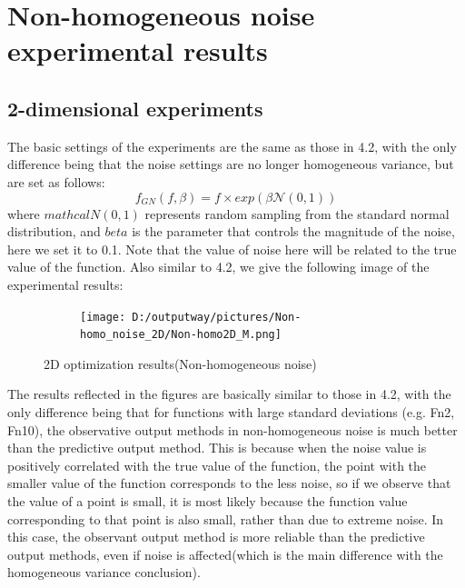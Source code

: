 \documentclass{article}
\begin{document}
\section{Non-homogeneous noise experimental results}
\subsection{2-dimensional experiments}
The basic settings of the experiments are the same as those in 4.2, with the only difference being that the noise settings are no longer homogeneous variance, but are set as follows:
\begin{equation}\label{eq12}
	f_{GN}(f,\beta) = f \times exp(\beta\mathcal{N}(0,1)) 
\end{equation}
where $mathcal{N}(0,1)$ represents random sampling from the standard normal distribution, and $beta$ is the parameter that controls the magnitude of the noise, here we set it to 0.1. Note that the value of noise here will be related to the true value of the function. Also similar to 4.2, we give the following image of the experimental results:

\begin{figure}[H]
    \centering
    \begin{subfigure}[t]{1\linewidth}
        \centering
        \texttt{[image: D:/outputway/pictures/Non-homo\_noise\_2D/Non-homo2D\_M.png]}
    \end{subfigure}
    \caption{2D optimization results(Non-homogeneous noise)}
    \label{Fig10}
\end{figure}

\hspace{2em}The results reflected in the figures are basically similar to those in 4.2, with the only difference being that for functions with large standard deviations (e.g. Fn2, Fn10), the observative output methods in non-homogeneous noise is much better than the predictive output method. This is because when the noise value is positively correlated with the true value of the function, the point with the smaller value of the function corresponds to the less noise, so if we observe that the value of a point is small, it is most likely because the function value corresponding to that point is also small, rather than due to extreme noise. In this case, the observant output method is more reliable than the predictive output methods, even if noise is affected(which is the main difference with the homogeneous variance conclusion).
\end{document}
